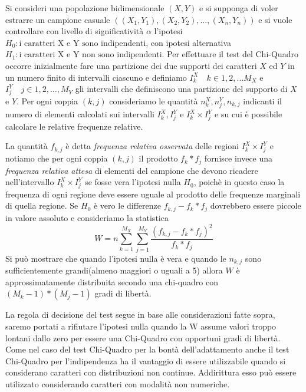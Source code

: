 Si consideri una popolazione bidimensionale $(X, Y)$ e si supponga di voler estrarre un campione casuale
$((X_1, Y_1), (X_2, Y_2), \dots, (X_n, Y_n))$ e si vuole controllare con livello di significatività $\alpha$
l'ipotesi $H_0:\mbox{i caratteri X e Y sono indipendenti}$, con ipotesi alternativa
$H_1:\mbox{i caratteri X e Y non sono indipendenti}$.\newline
Per effettuare il test del Chi-Quadro occorre inizialmente fare una partizione dei due supporti dei caratteri
$X$ ed $Y$ in un numero finito di intervalli ciascuno e definiamo $I_k^X \quad k \in 1,2,\dots M_X$ e 
$I_j^Y \quad j \in1,2, \dots, M_Y$ gli intervalli che definiscono una partizione del supporto di $X$ e $Y$.
Per ogni coppia $(k,j)$ consideriamo le quantità $n_k^X, n_j^Y, n_{k, j}$ indicanti il numero di elementi calcolati
sui intervalli $I_k^X, I_j^Y$ e $I_k^X \times I_j^Y$ e su cui è possibile calcolare le relative frequenze relative.

La quantità $f_{k, j}$ è detta \emph{frequenza relativa osservata} delle regioni $I_k^X \times I_j^Y$ e notiamo che per
ogni coppia $(k, j)$ il prodotto $f_k * f_j$ fornisce invece una \emph{frequenza relativa attesa} di elementi del
campione che devono ricadere nell'intervallo $I_k^X \times I_j^Y$ se fosse vera l'ipotesi nulla $H_0$, poichè in questo
caso la frequenza di ogni regione deve essere uguale al prodotto delle frequenze marginali di quella regione.\newline
Se $H_0$ è vero le differenze $f_{k, j} - f_k * f_j$ dovrebbero essere piccole in valore assoluto e consideriamo la statistica
\[ W = n \sum _{k = 1}^{M_X} \sum _{j = 1}^{M_Y} \frac{(f_{k, j} - f_k * f_j)^2}{f_k * f_j} \]
Si può mostrare che quando l’ipotesi nulla è vera e quando le $n_{k,j}$ sono sufficientemente grandi(almeno maggiori o
uguali a 5) allora $W$ è approssimatamente distribuita secondo una chi-quadro con $(M_k - 1) * (M_j - 1)$ gradi di libertà.

La regola di decisione del test segue in base alle considerazioni fatte sopra, saremo portati a rifiutare l’ipotesi nulla
quando la W assume valori troppo lontani dallo zero per essere una Chi-Quadro con opportuni gradi di libertà.\newline
Come nel caso del test Chi-Quadro per la bontà dell’adattamento anche il test Chi-Quadro per l’indipendenza 
ha il vantaggio di essere utilizzabile quando si considerano caratteri con distribuzioni non continue.\newline
Addirittura esso può essere utilizzato considerando caratteri con modalità non numeriche.

